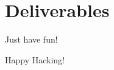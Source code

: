\documentclass[11pt]{article}
\begin{document}
\section{Deliverables}
\label{sec:deliverables}


Just have fun!

\vspace{5mm}
\noindent Happy Hacking!
\end{document}
